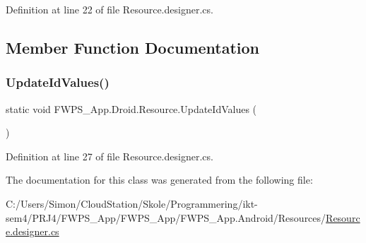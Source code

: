 Definition at line 22 of file Resource.\+designer.\+cs.



\subsection{Member Function Documentation}
\mbox{\label{class_f_w_p_s___app_1_1_droid_1_1_resource_a0f6d3905251c68ad92ff0e5d9f38ee8b}} 
\subsubsection{\texorpdfstring{Update\+Id\+Values()}{UpdateIdValues()}}
{\footnotesize\ttfamily static void F\+W\+P\+S\+\_\+\+App.\+Droid.\+Resource.\+Update\+Id\+Values (\begin{DoxyParamCaption}{ }\end{DoxyParamCaption})\hspace{0.3cm}{\ttfamily [static]}}



Definition at line 27 of file Resource.\+designer.\+cs.



The documentation for this class was generated from the following file\+:\begin{DoxyCompactItemize}
\item 
C\+:/\+Users/\+Simon/\+Cloud\+Station/\+Skole/\+Programmering/ikt-\/sem4/\+P\+R\+J4/\+F\+W\+P\+S\+\_\+\+App/\+F\+W\+P\+S\+\_\+\+App/\+F\+W\+P\+S\+\_\+\+App.\+Android/\+Resources/\mbox{\hyperlink{_resource_8designer_8cs}{Resource.\+designer.\+cs}}\end{DoxyCompactItemize}
